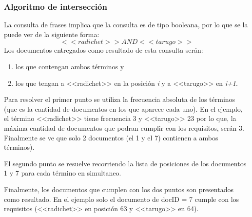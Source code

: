 \subsubsection{Algoritmo de intersección}

La consulta de frases implica que la consulta es de tipo booleana, por lo que se la puede ver de la siguiente forma: 
\[ <<radichet>> AND <<tarugo>> \]
Los documentos entregados como resultado de esta consulta serán:
\begin{enumerate}
	\item los que contengan ambos términos y
	\item los que tengan a <<radichet>> en la posición \textit{i} y a <<tarugo>> en \textit{i+1}.
\end{enumerate}

Para resolver el primer punto se utiliza la frecuencia absoluta de los términos (que es la cantidad de documentos en los que aparece cada uno). En el ejemplo, el término <<radichet>> tiene frecuencia 3 y <<tarugo>> 23 por lo que, la máxima cantidad de documentos que podran cumplir con los requisitos, serán 3. 
Finalmente se ve que solo 2 documentos (el 1 y el 7) contienen a ambos términos).

El segundo punto se resuelve recorriendo la lista de posiciones de los documentos 1 y 7 para cada término en simultaneo.

Finalmente, los documentos que cumplen con los dos puntos son presentados como resultado. En el ejemplo solo el documento de docID = 7 cumple con los requisitos (<<radichet>> en posición 63 y <<tarugo>> en 64).



